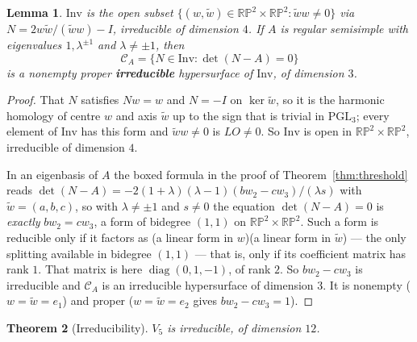 \documentclass[11pt,a4paper]{article}
\theoremstyle{plain}
\newtheorem{theorem}{Theorem}[section]
\newtheorem{lemma}[theorem]{Lemma}
\theoremstyle{definition}
\theoremstyle{remark}
\newcommand{\RP}{\mathbb{RP}}
\newcommand{\PGL}{\mathrm{PGL}}
\begin{document}
\begin{lemma}\label{lem:invchart}
$\mathrm{Inv}$ is the open subset $\{(w,\tilde w)\in\RP^2\times\RP^2:\tilde
ww\neq0\}$ via $N=2w\tilde w/(\tilde ww)-I$, irreducible of dimension $4$. If $A$
is regular semisimple with eigenvalues $1,\lambda^{\pm1}$ and $\lambda\neq\pm1$,
then
\[
  \mathcal C_A=\{N\in\mathrm{Inv}:\det(N-A)=0\}
\]
is a nonempty proper \textbf{irreducible} hypersurface of $\mathrm{Inv}$, of
dimension $3$.
\end{lemma}

\begin{proof}
That $N$ satisfies $Nw=w$ and $N=-I$ on $\ker\tilde w$, so it is the harmonic
homology of centre $w$ and axis $\tilde w$ up to the sign that is trivial in
$\PGL_3$; every element of $\mathrm{Inv}$ has this form and $\tilde ww\neq0$ is
$LO\neq0$. So $\mathrm{Inv}$ is open in $\RP^2\times\RP^2$, irreducible of
dimension $4$.

In an eigenbasis of $A$ the boxed formula in the proof of
Theorem~\ref{thm:threshold} reads
$\det(N-A)=-2(1+\lambda)(\lambda-1)(bw_2-cw_3)/(\lambda s)$ with $\tilde
w=(a,b,c)$, so with $\lambda\neq\pm1$ and $s\neq0$ the equation $\det(N-A)=0$ is
\emph{exactly} $bw_2=cw_3$, a form of bidegree $(1,1)$ on $\RP^2\times\RP^2$. Such
a form is reducible only if it factors as (a linear form in $w$)(a linear form in
$\tilde w$) --- the only splitting available in bidegree $(1,1)$ --- that is, only
if its coefficient matrix has rank $1$. That matrix is here
$\operatorname{diag}(0,1,-1)$, of rank $2$. So $bw_2-cw_3$ is irreducible and
$\mathcal C_A$ is an irreducible hypersurface of dimension $3$. It is nonempty
($w=\tilde w=e_1$) and proper ($w=\tilde w=e_2$ gives $bw_2-cw_3=1$).
\end{proof}

\begin{theorem}[Irreducibility]\label{thm:irred}
$V_5$ is irreducible, of dimension $12$.
\end{theorem}
\end{document}
